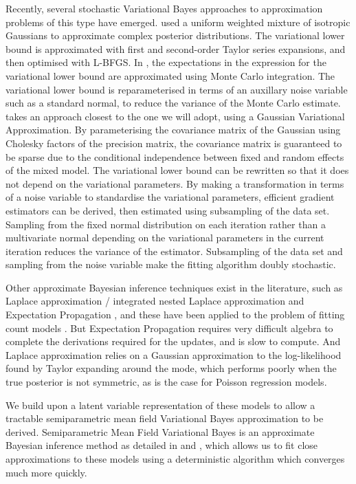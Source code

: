 Recently, several stochastic Variational Bayes approaches to approximation
problems of this type have emerged.  \cite{Gershman2012} used a uniform
weighted mixture of isotropic Gaussians to approximate complex posterior
distributions. The variational lower bound is approximated with first and
second-order Taylor series expansions, and then optimised with L-BFGS.  In
\cite{Kingma2013}, the expectations in the expression for the variational lower
bound are approximated using Monte Carlo integration. The variational lower
bound is reparameterised in terms of an auxillary noise variable such as a
standard normal, to reduce the variance of the Monte Carlo estimate.
\cite{Tan2018} takes an approach closest to the one we will adopt, using a
Gaussian Variational Approximation.  By parameterising the covariance matrix of
the Gaussian using Cholesky factors of the precision matrix, the covariance
matrix is guaranteed to be sparse due to the conditional independence between
fixed and random effects of the mixed model. The variational lower bound can be
rewritten so that it does not depend on the variational parameters.  By making
a transformation in terms of a noise variable to standardise the variational
parameters, efficient gradient estimators can be derived, then estimated using
subsampling of the data set. Sampling from the fixed normal distribution on
each iteration rather than a multivariate normal depending on the variational
parameters in the current iteration reduces the variance of the estimator.
Subsampling of the data set and sampling from the noise variable make the
fitting algorithm doubly stochastic.

Other approximate Bayesian inference techniques exist in the literature, such
as Laplace approximation \cite{Tierney1986}/ integrated nested Laplace
approximation \cite{Rue2009} and Expectation Propagation \cite{Minka2013}, and
these have been applied to the problem of fitting count models
\cite{Barber2016} \cite{KimWand2017}.  But Expectation Propagation requires
very difficult algebra to complete the derivations required for the updates,
and is slow to compute. And Laplace approximation relies on a Gaussian
approximation to the log-likelihood found by Taylor expanding around the mode,
which performs poorly when the true posterior is not symmetric, as is the case
for Poisson regression models.

We build upon a latent variable representation of these models to allow a
tractable semiparametric mean field Variational Bayes approximation to be
derived. Semiparametric Mean Field Variational Bayes is an approximate Bayesian
inference method as detailed in \cite{Ormerod2010} and \cite{Rohde2015}, which
allows us to fit close approximations to these models using a deterministic
algorithm which converges much more quickly.

